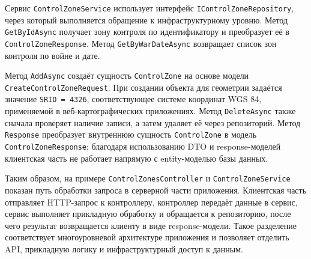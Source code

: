 Сервис \texttt{ControlZoneService} использует интерфейс \texttt{IControlZoneRepository}, через который выполняется обращение к инфраструктурному уровню. Метод \texttt{GetByIdAsync} получает зону контроля по идентификатору и преобразует её в \texttt{ControlZoneResponse}. Метод \texttt{GetByWarDateAsync} возвращает список зон контроля по войне и дате.

Метод \texttt{AddAsync} создаёт сущность \texttt{ControlZone} на основе модели \texttt{CreateControlZoneRequest}. При создании объекта для геометрии задаётся значение \texttt{SRID = 4326}, соответствующее системе координат WGS 84, применяемой в веб-картографических приложениях. Метод \texttt{DeleteAsync} также сначала проверяет наличие записи, а затем удаляет её через репозиторий. Метод \texttt{Response} преобразует внутреннюю сущность \texttt{ControlZone} в модель \texttt{ControlZoneResponse}; благодаря использованию DTO и response-моделей клиентская часть не работает напрямую с entity-моделью базы данных.

Таким образом, на примере \texttt{ControlZonesController} и \texttt{ControlZoneService} показан путь обработки запроса в серверной части приложения. Клиентская часть отправляет HTTP-запрос к контроллеру, контроллер передаёт данные в сервис, сервис выполняет прикладную обработку и обращается к репозиторию, после чего результат возвращается клиенту в виде response-модели. Такое разделение соответствует многоуровневой архитектуре приложения и позволяет отделить API, прикладную логику и инфраструктурный доступ к данным.
